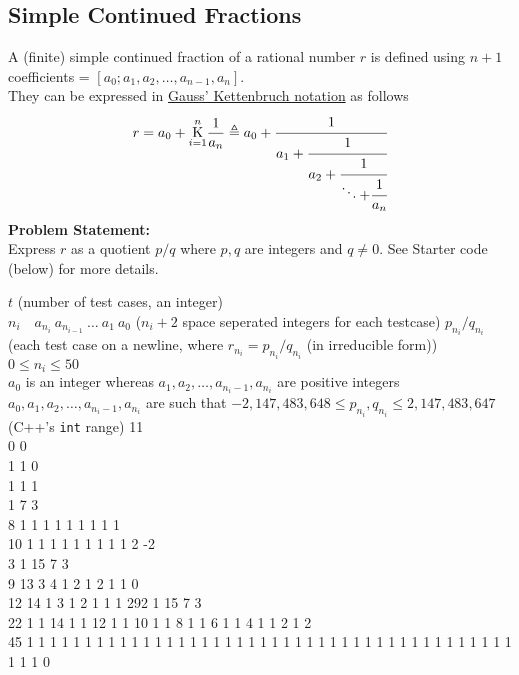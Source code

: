 \subsection{Simple Continued Fractions}{\label{pp:simplecontinuedfractions}}
{A (finite) simple continued fraction of a rational number $r$ is defined using $n+1$ coefficients = $[a_0; a_1, a_2,\ldots, a_{n-1}, a_n]$.
\\They can be expressed in \href{https://en.wikipedia.org/wiki/Generalized_continued_fraction#Notation}{Gauss' Kettenbruch notation} as follows
\begin{equation}
{ r=a_{0}+{\underset {i=1}{\overset {n }{\mathrm {K} }}}{\frac {1}{a_{n}}}\triangleq a_{0}+{\cfrac {1}{a_{1}+{\cfrac {1}{a_{2}+{\cfrac {1}{\ddots{+{\cfrac{1}{a_n} }}}}}}}} }
\end{equation}
\textbf{Problem Statement:}\\
Express $r$ as a quotient $p/q$ where $p,q$ are integers and $q\neq0$. See Starter code (below) for more details.
\begin{testcases}
	{$t$ \hfill(number of test cases, an integer)\\%
	$n_i\quad a_{n_i}\ a_{n_{i-1}}\ \ldots\ a_1\ a_0$ \hfill($n_i+2$ space seperated integers for each testcase)}
	{$p_{n_i}/q_{n_i}$ \hfill(each test case on a newline, where $r_{n_i} = p_{n_i}/q_{n_i}$ (in irreducible form))
	}
	{$0 \leq n_i \leq 50$\\
	$a_{0}$ is an integer whereas $a_1, a_2, \ldots, a_{n_i -1}, a_{n_i}$ are positive integers\\
	$a_0, a_1, a_2, \ldots, a_{n_i -1}, a_{n_i}$ are such that $-2,147,483,648\leq p_{n_i},q_{n_i}\leq2,147,483,647$\hfill(C++'s \texttt{int} range)%
	}
	{11\\0 0\\1 1 0\\1 1 1\\1 7 3\\8 1 1 1 1 1 1 1 1 1\\10 1 1 1 1 1 1 1 1 1 2 -2\\3 1 15 7 3\\9 13 3 4 1 2 1 2 1 1 0\\12 14 1 3 1 2 1 1 1 292 1 15 7 3\\22 1 1 14 1 1 12 1 1 10 1 1 8 1 1 6 1 1 4 1 1 2 1 2\\45 1 1 1 1 1 1 1 1 1 1 1 1 1 1 1 1 1 1 1 1 1 1 1 1 1 1 1 1 1 1 1 1 1 1 1 1 1 1 1 1 1 1 1 1 1 0}

\end{testcases}}
